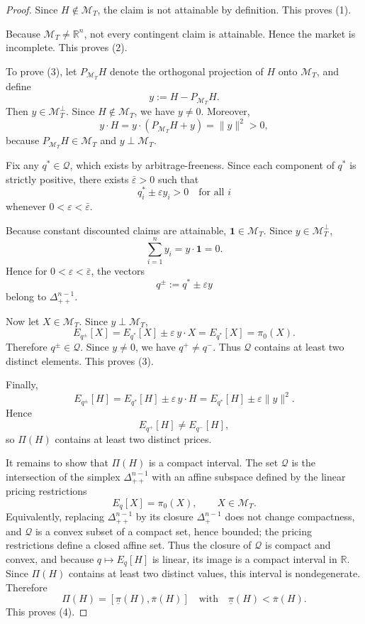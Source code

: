 \documentclass[12pt,a4paper]{article}
\begin{document}
\begin{proof}
Since $H\notin \mathcal{M}_T$, the claim is not attainable by definition. This proves (1).

Because $\mathcal{M}_T\neq \mathbb{R}^n$, not every contingent claim is attainable. Hence the market is incomplete. This proves (2).

To prove (3), let $P_{\mathcal{M}_T}H$ denote the orthogonal projection of $H$ onto $\mathcal{M}_T$, and define
\[
y:=H-P_{\mathcal{M}_T}H.
\]
Then $y\in \mathcal{M}_T^\perp$. Since $H\notin \mathcal{M}_T$, we have $y\neq 0$. Moreover,
\[
y\cdot H
=
y\cdot(P_{\mathcal{M}_T}H+y)
=
\|y\|^2
>
0,
\]
because $P_{\mathcal{M}_T}H\in\mathcal{M}_T$ and $y\perp \mathcal{M}_T$.

Fix any $q^\ast\in\mathcal{Q}$, which exists by arbitrage-freeness. Since each component of $q^\ast$ is strictly positive, there exists $\bar\varepsilon>0$ such that
\[
q_i^\ast \pm \varepsilon y_i >0
\quad\text{for all }i
\]
whenever $0<\varepsilon<\bar\varepsilon$.

Because constant discounted claims are attainable, $\mathbf{1}\in\mathcal{M}_T$. Since $y\in\mathcal{M}_T^\perp$,
\[
\sum_{i=1}^n y_i
=
y\cdot \mathbf{1}
=
0.
\]
Hence for $0<\varepsilon<\bar\varepsilon$, the vectors
\[
q^\pm:=q^\ast\pm \varepsilon y
\]
belong to $\Delta_{++}^{n-1}$.

Now let $X\in\mathcal{M}_T$. Since $y\perp \mathcal{M}_T$,
\[
E_{q^\pm}[X]
=
E_{q^\ast}[X]\pm \varepsilon\, y\cdot X
=
E_{q^\ast}[X]
=
\pi_0(X).
\]
Therefore $q^\pm\in\mathcal{Q}$. Since $y\neq 0$, we have $q^+\neq q^-$. Thus $\mathcal{Q}$ contains at least two distinct elements. This proves (3).

Finally,
\[
E_{q^\pm}[H]
=
E_{q^\ast}[H]\pm \varepsilon\, y\cdot H
=
E_{q^\ast}[H]\pm \varepsilon \|y\|^2.
\]
Hence
\[
E_{q^+}[H]\neq E_{q^-}[H],
\]
so $\Pi(H)$ contains at least two distinct prices.

It remains to show that $\Pi(H)$ is a compact interval. The set $\mathcal{Q}$ is the intersection of the simplex $\Delta_{++}^{n-1}$ with an affine subspace defined by the linear pricing restrictions
\[
E_q[X]=\pi_0(X), \qquad X\in\mathcal{M}_T.
\]
Equivalently, replacing $\Delta_{++}^{n-1}$ by its closure $\Delta_+^{n-1}$ does not change compactness, and $\mathcal{Q}$ is a convex subset of a compact set, hence bounded; the pricing restrictions define a closed affine set. Thus the closure of $\mathcal{Q}$ is compact and convex, and because $q\mapsto E_q[H]$ is linear, its image is a compact interval in $\mathbb{R}$. Since $\Pi(H)$ contains at least two distinct values, this interval is nondegenerate. Therefore
\[
\Pi(H)=[\underline{\pi}(H),\overline{\pi}(H)]
\quad\text{with}\quad
\underline{\pi}(H)<\overline{\pi}(H).
\]
This proves (4).
\end{proof}
\end{document}
